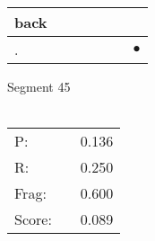 \documentclass[landscape]{article}
\newcommand{\ssp}{\hspace{2pt}}
\newcommand{\mex}{\cellcolor{g}$\bullet$}
\begin{document}
\begin{tabular}{|l|p{10pt}|p{10pt}|p{10pt}|p{10pt}|p{10pt}|p{10pt}|}
\hline
\ssp back \ssp&\hspace{2pt}&\hspace{2pt}&\hspace{2pt}&\hspace{2pt}&\hspace{2pt}&\hspace{2pt}\\
\hline
\ssp \cellcolor{ref5}. \ssp&\hspace{2pt}&\hspace{2pt}&\hspace{2pt}&\hspace{2pt}&\hspace{2pt}&\hspace{2pt}\mex\\
\hline
\end{tabular}

\vspace{6pt}
\noindent Segment 45\\\\
\noindent\begin{tabular}{lm{12pt}r}
\hline
P:&&0.136\\
R:&&0.250\\
Frag:&&0.600\\
Score:&&0.089\\
\end{tabular}

\newpage
\end{document}

